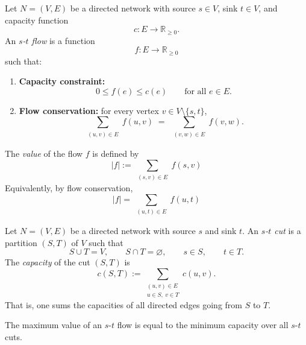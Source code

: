 \documentclass[11pt, a4paper]{ctexrep}
\begin{document}
\begin{definition}[$s$-$t$ flow]
    Let $N=(V,E)$ be a directed network with source $s\in V$, sink $t\in V$, and
    capacity function
    \[
        c:E\to \mathbb{R}_{\ge 0}.
    \]
    An \emph{$s$-$t$ flow} is a function
    \[
        f:E\to \mathbb{R}_{\ge 0}
    \]
    such that:

    \begin{enumerate}
        \item[(i)] \textbf{Capacity constraint:}
              \[
                  0\le f(e)\le c(e)\qquad \text{for all } e\in E.
              \]

        \item[(ii)] \textbf{Flow conservation:} for every vertex $v\in V\setminus\{s,t\}$,
              \[
                  \sum_{\substack{(u,v)\in E}} f(u,v)
                  \;=\;
                  \sum_{\substack{(v,w)\in E}} f(v,w).
              \]
    \end{enumerate}

    The \emph{value} of the flow $f$ is defined by
    \[
        |f|
        :=
        \sum_{\substack{(s,v)\in E}} f(s,v)
    \]
    Equivalently, by flow conservation,
    \[
        |f|
        =
        \sum_{\substack{(u,t)\in E}} f(u,t)
    \]
\end{definition}

\begin{definition}[$s$-$t$ cut]
    Let $N=(V,E)$ be a directed network with source $s$ and sink $t$.
    An \emph{$s$-$t$ cut} is a partition $(S,T)$ of $V$ such that
    \[
        S\cup T=V,\qquad S\cap T=\varnothing,\qquad s\in S,\qquad t\in T.
    \]
    The \emph{capacity} of the cut $(S,T)$ is
    \[
        c(S,T):=\sum_{\substack{(u,v)\in E\\ u\in S,\ v\in T}} c(u,v).
    \]
    That is, one sums the capacities of all directed edges going from $S$ to $T$.
\end{definition}

\begin{theorem}\label{thm:maxflow}
    The maximum value of an $s$-$t$ flow is equal to the minimum capacity over all $s$-$t$ cuts.
\end{theorem}
\end{document}
